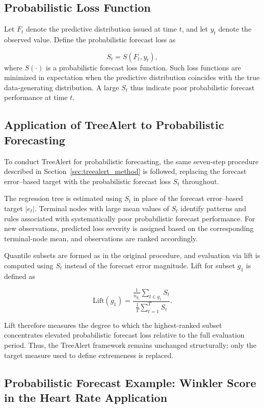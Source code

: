\documentclass[preprint,12pt]{elsarticle}
\begin{document}
\subsection{Probabilistic Loss Function}
Let $F_t$ denote the predictive distribution issued at time $t$, and let $y_t$ denote the observed value.
Define the probabilistic forecast loss as

\[
S_t = S(F_t, y_t),
\] where $S(\cdot)$ is a probabilistic forecast loss function. Such loss functions are minimized in expectation when the predictive distribution coincides with the true data-generating distribution. A large  $S_t$ thus indicate poor probabilistic forecast performance at time $t$.

\subsection{Application of TreeAlert to Probabilistic Forecasting}

To conduct TreeAlert for probabilistic forecasting, the same seven-step procedure described in Section~\ref{sec:treealert_method} is followed, replacing the forecast error–based target with the probabilistic forecast loss $S_t$ throughout.

The regression tree is estimated using $S_t$ in place of the forecast error–based target $|e_t|$. Terminal nodes with large mean values of $S_t$ identify patterns and rules associated with systematically poor probabilistic forecast performance. For new observations, predicted loss severity is assigned based on the corresponding terminal-node mean, and observations are ranked accordingly. 

Quantile subsets are formed as in the original procedure, and evaluation via lift is computed using $S_t$ instead of the forecast error magnitude. Lift for subset $g_{1}$ is defined as

\begin{equation}
\text{Lift}(g_{1}) =
\frac{
\displaystyle \frac{1}{n_{g_1}} \sum_{t \in g_{1}} S_t
}{
\displaystyle \frac{1}{T} \sum_{t=1}^{T} S_t
}.
\end{equation}

Lift therefore measures the degree to which the highest-ranked subset concentrates elevated probabilistic forecast loss relative to the full evaluation period. Thus, the TreeAlert framework remains unchanged structurally; only the target measure used to define extremeness is replaced.

\subsection*{Probabilistic Forecast Example: Winkler Score in the Heart Rate Application}
\end{document}
